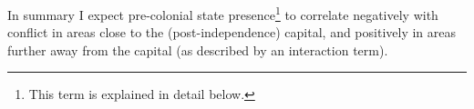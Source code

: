 \documentclass[12pt]{article}
\begin{document}
In summary I expect pre-colonial state presence\footnote{This term is explained
in detail below.} to correlate negatively with conflict in areas close to the
(post-independence) capital, and positively in areas further away from the
capital (as described by an interaction term).

% 
% 
% 
% 
\end{document}
